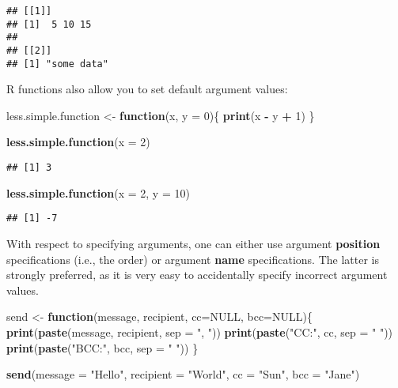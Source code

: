 \documentclass[
]{book}
\newenvironment{Shaded}{\begin{snugshade}}{\end{snugshade}}
\newcommand{\ControlFlowTok}[1]{\textcolor[rgb]{0.13,0.29,0.53}{\textbf{#1}}}
\newcommand{\DataTypeTok}[1]{\textcolor[rgb]{0.13,0.29,0.53}{#1}}
\newcommand{\DecValTok}[1]{\textcolor[rgb]{0.00,0.00,0.81}{#1}}
\newcommand{\KeywordTok}[1]{\textcolor[rgb]{0.13,0.29,0.53}{\textbf{#1}}}
\newcommand{\NormalTok}[1]{#1}
\newcommand{\OperatorTok}[1]{\textcolor[rgb]{0.81,0.36,0.00}{\textbf{#1}}}
\newcommand{\OtherTok}[1]{\textcolor[rgb]{0.56,0.35,0.01}{#1}}
\newcommand{\StringTok}[1]{\textcolor[rgb]{0.31,0.60,0.02}{#1}}
\begin{document}
\begin{verbatim}
## [[1]]
## [1]  5 10 15
## 
## [[2]]
## [1] "some data"
\end{verbatim}

R functions also allow you to set default argument values:

\begin{Shaded}
\begin{Highlighting}[]
\NormalTok{less.simple.function \textless{}{-}}\StringTok{ }\ControlFlowTok{function}\NormalTok{(x, }\DataTypeTok{y =} \DecValTok{0}\NormalTok{)\{}
  \KeywordTok{print}\NormalTok{(x }\OperatorTok{{-}}\StringTok{ }\NormalTok{y }\OperatorTok{+}\StringTok{ }\DecValTok{1}\NormalTok{)}
\NormalTok{\}}

\KeywordTok{less.simple.function}\NormalTok{(}\DataTypeTok{x =} \DecValTok{2}\NormalTok{)}
\end{Highlighting}
\end{Shaded}

\begin{verbatim}
## [1] 3
\end{verbatim}

\begin{Shaded}
\begin{Highlighting}[]
\KeywordTok{less.simple.function}\NormalTok{(}\DataTypeTok{x =} \DecValTok{2}\NormalTok{, }\DataTypeTok{y =} \DecValTok{10}\NormalTok{)}
\end{Highlighting}
\end{Shaded}

\begin{verbatim}
## [1] -7
\end{verbatim}

With respect to specifying arguments, one can either use argument \textbf{position} specifications (i.e., the order) or argument \textbf{name} specifications. The latter is strongly preferred, as it is very easy to accidentally specify incorrect argument values.

\begin{Shaded}
\begin{Highlighting}[]
\NormalTok{send \textless{}{-}}\StringTok{ }\ControlFlowTok{function}\NormalTok{(message, recipient, }\DataTypeTok{cc=}\OtherTok{NULL}\NormalTok{, }\DataTypeTok{bcc=}\OtherTok{NULL}\NormalTok{)\{}
  \KeywordTok{print}\NormalTok{(}\KeywordTok{paste}\NormalTok{(message, recipient, }\DataTypeTok{sep =} \StringTok{", "}\NormalTok{))}
  \KeywordTok{print}\NormalTok{(}\KeywordTok{paste}\NormalTok{(}\StringTok{"CC:"}\NormalTok{, cc, }\DataTypeTok{sep =} \StringTok{" "}\NormalTok{))}
  \KeywordTok{print}\NormalTok{(}\KeywordTok{paste}\NormalTok{(}\StringTok{"BCC:"}\NormalTok{, bcc, }\DataTypeTok{sep =} \StringTok{" "}\NormalTok{))}
\NormalTok{\}}

\KeywordTok{send}\NormalTok{(}\DataTypeTok{message =} \StringTok{"Hello"}\NormalTok{, }\DataTypeTok{recipient =} \StringTok{"World"}\NormalTok{, }\DataTypeTok{cc =} \StringTok{"Sun"}\NormalTok{, }\DataTypeTok{bcc =} \StringTok{"Jane"}\NormalTok{)}
\end{Highlighting}
\end{Shaded}
\end{document}
